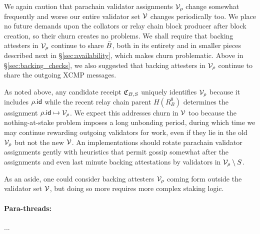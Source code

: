 We again caution that parachain validator assignments $\mathcal{V}_{\rho}$ change somewhat frequently and worse our entire validator set $\mathcal{V}$ changes periodically too.  We place no future demands upon the collators or relay chain block producer after block creation, so their churn creates no problems.  We shall require that backing attesters in $\mathcal{V}_{\rho}$ continue to share $\bar{B}$, both in its entirety and in smaller pieces described next in \S\ref{sec:availability}, which makes churn problematic.  Above in \S\ref{sec:backing_checks}, we also suggested that backing attesters in $\mathcal{V}_{\rho}$ continue to share the outgoing XCMP messages.

As noted above, any candidate receipt $\mathfrak{C}_{B,S}$ uniquely identifies $\mathcal{V}_{\rho}$ because it includes $\rho.\mathsf{id}$ while the recent relay chain parent $H(R^0_B)$ determines the assignment $\rho.\mathsf{id} \mapsto \mathcal{V}_{\rho}$.
We expect this addresses churn in $\mathcal{V}$ too because the nothing-at-stake problem imposes a long unbonding period, during which time we may continue rewarding outgoing validators for work, even if they lie in the old $\mathcal{V}_{\rho}$ but not the new $\mathcal{V}$.   
An implementations should rotate parachain validator assignments gently with heuristics that permit gossip somewhat after the assignments and even last minute backing attestations by validators in $\mathcal{V}_{\rho} \setminus S$.

As an aside, one could consider backing attesters $\mathcal{V}_{\rho}$ coming form outside the validator set $\mathcal{V}$, but doing so more requires more complex staking logic. 

\smallskip
\paragraph{Para-threads:}

...
